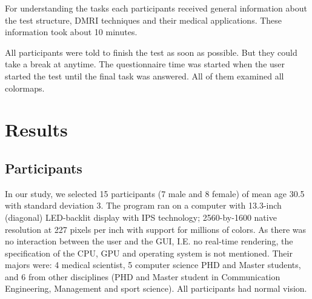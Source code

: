 \documentclass[a4paper, 12pt]{report}
\begin{document}
For understanding the tasks each participants received general information about the test structure, DMRI techniques and their medical applications. These information took about 10 minutes. 

All participants were told to finish the test as soon as possible. But they could take a break at anytime. The questionnaire time was started when the user started the test until the final task was answered. 
All of them examined all colormaps.

\chapter{Results}
\section{Participants }
In our study, we selected 15 participants (7 male and 8 female) of mean age 30.5 with standard deviation 3.
The program ran on a computer with 13.3-inch (diagonal) LED-backlit display with IPS technology; 2560-by-1600 native resolution at 227 pixels per inch with support for millions of colors. As there was no interaction between the user and the GUI, I.E. no real-time rendering, the specification of the CPU, GPU and operating system is not mentioned. Their majors were: 4 medical scientist, 5 computer science PHD and Master students, and 6 from other disciplines (PHD and Master student in Communication Engineering, Management and sport science). All participants had normal vision. 



\end{document}
